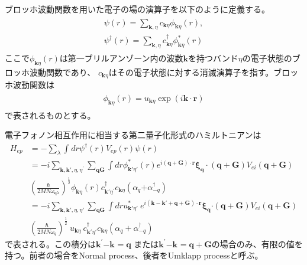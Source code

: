 \documentclass[letterpaper,10pt,dvipdfmx]{sphinxhowto}
\begin{document}
ブロッホ波動関数を用いた電子の場の演算子を以下のように定義する。
\begin{equation*}
\begin{split}\begin{aligned}
\psi(r) = \sum_{\mathbf{k},\eta}c_{\mathbf{k}\eta}\phi_{\mathbf{k}\eta}(r), \\
\psi^{\dagger}\left( r \right) =
\sum_{\mathbf{k},\eta}{c_{\mathbf{k}\eta}^{\dagger}\phi_{\mathbf{k}\eta}^{*}(r)}\end{aligned}\end{split}
\end{equation*}
ここで\(\phi_{\mathbf{k}\eta}(r)\)は第一ブリルアンゾーン内の波数\(\mathbf{k}\)を持つバンド\(\eta\)の電子状態のブロッホ波動関数であり、
\(c_{\mathbf{k}\eta}\)はその電子状態に対する消滅演算子を指す。ブロッホ波動関数は
\begin{equation*}
\begin{split}\begin{aligned}
\phi_{\mathbf{k}\eta}\left( r \right) = u_{\mathbf{k}\eta}\exp{\left(
i\mathbf{k} \cdot \mathbf{r} \right)}\end{aligned}\end{split}
\end{equation*}
で表されるものとする。

電子フォノン相互作用に相当する第二量子化形式のハミルトニアンは
\label{\detokenize{index:equation-Hep}}\begin{equation}\label{equation:index:Hep}
\begin{split}H_{ep} &= - \sum_{\lambda}\int_{}^{}dr \psi^{\dagger}(r)V_{ep}(r)\psi(r) \\
&= -i\sum_{\mathbf{k,k'},\eta,\eta^{'}} \sum_{\mathbf{qG}}
\int dr\phi^*_{\mathbf{k'}\eta'}(r)e^{i(\mathbf{q+G}) \cdot
\mathbf{r}} \mathbf{\xi}_{\mathbf{q}}\cdot
(\mathbf{q+G})V_{ei}( \mathbf{q+G}) \nonumber \\
&\left(\frac{\hbar}{2MN\omega_{\mathbf{q}\lambda}} \right)^{\frac{1}{2}}
\phi_{\mathbf{k}\eta}(r)c_{\mathbf{k'}\eta^{'}}^{\dagger}
c_{\mathbf{k}\eta}\left(\alpha_{q}{+ \alpha_{-q}^{\dagger}}
\right) \nonumber \\
&= -i\sum_{\mathbf{k,k'},\eta,\eta'}\sum_{\mathbf{qG}}\int dr
u_{\mathbf{k'}\eta'}^{*}\ e^{i (\mathbf{k -k'+ q +G}) \cdot \mathbf{r}}
\mathbf{\xi}_{\mathbf{q}}\mathbf{\cdot}(\mathbf {q + G})V_{ei}\left( \mathbf{q}
+ \mathbf{G} \right)\nonumber \\
& \left( \frac{\hbar}{2MN\omega_{q}}
\right)^{\frac{1}{2}}\ u_{\mathbf{k}\eta}\ c_{\mathbf{k'}\eta'}^{\dagger}c_{\mathbf{k}\eta}
\left( \alpha_{q}+ \alpha_{-q}^{\dagger} \right)\end{split}
\end{equation}
で表される。この積分は\(\mathbf{k}^{\mathbf{'}}\mathbf{-}\mathbf{k}^{}\mathbf{= q}\)
または\(\mathbf{k}^{\mathbf{'}}\mathbf{-}\mathbf{k}^{} = \mathbf{q} + \mathbf{G}\)の場合のみ、有限の値を持つ。前者の場合をNormal
process、後者をUmklapp processと呼ぶ。
\end{document}

